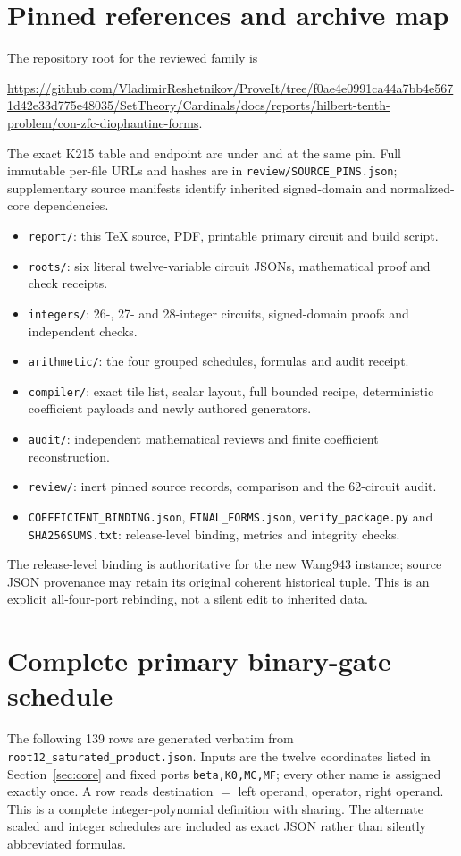 \documentclass[11pt]{article}
\begin{document}
\section{Pinned references and archive map}

The repository root for the reviewed family is
\begin{center}\small
\url{https://github.com/VladimirReshetnikov/ProveIt/tree/f0ae4e0991ca44a7bb4e5671d42e33d775e48035/SetTheory/Cardinals/docs/reports/hilbert-tenth-problem/con-zfc-diophantine-forms}.
\end{center}
The exact K215 table and endpoint are under
 and
at the same pin. Full immutable per-file URLs and hashes are in
\texttt{review/SOURCE\_PINS.json}; supplementary source manifests identify inherited signed-domain and normalized-core dependencies.

\begin{itemize}
\item \texttt{report/}: this TeX source, PDF, printable primary circuit and build script.
\item \texttt{roots/}: six literal twelve-variable circuit JSONs, mathematical proof and check receipts.
\item \texttt{integers/}: 26-, 27- and 28-integer circuits, signed-domain proofs and independent checks.
\item \texttt{arithmetic/}: the four grouped schedules, formulas and audit receipt.
\item \texttt{compiler/}: exact tile list, scalar layout, full bounded recipe, deterministic coefficient payloads and newly authored generators.
\item \texttt{audit/}: independent mathematical reviews and finite coefficient reconstruction.
\item \texttt{review/}: inert pinned source records, comparison and the 62-circuit audit.
\item \texttt{COEFFICIENT\_BINDING.json}, \texttt{FINAL\_FORMS.json}, \texttt{verify\_package.py} and \texttt{SHA256SUMS.txt}: release-level binding, metrics and integrity checks.
\end{itemize}
The release-level binding is authoritative for the new Wang943 instance; source JSON provenance may retain its original coherent historical tuple. This is an explicit all-four-port rebinding, not a silent edit to inherited data.

\appendix
\section{Complete primary binary-gate schedule}\label{app:slp}

The following 139 rows are generated verbatim from \texttt{root12\_saturated\_product.json}. Inputs are the twelve coordinates listed in Section~\ref{sec:core} and fixed ports \texttt{beta,K0,MC,MF}; every other name is assigned exactly once. A row reads destination $=$ left operand, operator, right operand. This is a complete integer-polynomial definition with sharing. The alternate scaled and integer schedules are included as exact JSON rather than silently abbreviated formulas.

\end{document}
